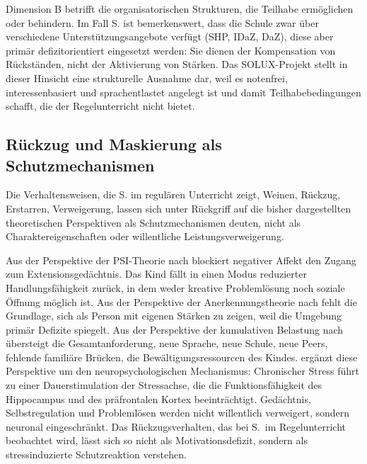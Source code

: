 \documentclass[ngerman, a4paper]{article}
\begin{document}
Dimension B betrifft die organisatorischen Strukturen, die Teilhabe ermöglichen oder
behindern. Im Fall S. ist bemerkenswert, dass die Schule zwar über verschiedene
Unterstützungsangebote verfügt (SHP, IDaZ, DaZ), diese aber primär
defizitorientiert eingesetzt werden: Sie dienen der Kompensation von Rückständen,
nicht der Aktivierung von Stärken. Das SOLUX-Projekt stellt in dieser Hinsicht
eine strukturelle Ausnahme dar, weil es notenfrei, interessenbasiert und
sprachentlastet angelegt ist und damit Teilhabebedingungen schafft, die der
Regelunterricht nicht bietet.

\subsection{Rückzug und Maskierung als Schutzmechanismen}

Die Verhaltensweisen, die S. im regulären Unterricht zeigt, Weinen, Rückzug, Erstarren,
Verweigerung, lassen sich unter Rückgriff auf die bisher dargestellten theoretischen
Perspektiven als Schutzmechanismen deuten, nicht als Charaktereigenschaften oder
willentliche Leistungsverweigerung.

Aus der Perspektive der PSI-Theorie nach \textcite[S.\,35--57]{kuhl2019diversitaet} blockiert negativer Affekt den Zugang zum
Extensionsgedächtnis. Das Kind fällt in einen Modus reduzierter Handlungsfähigkeit
zurück, in dem weder kreative Problemlösung noch soziale Öffnung möglich ist. Aus der
Perspektive der Anerkennungstheorie nach \textcite[S.\,90\psq]{grossrieder2010anerkennung} fehlt die Grundlage, sich als Person
mit eigenen Stärken zu zeigen, weil die Umgebung primär Defizite spiegelt. Aus der
Perspektive der kumulativen Belastung nach \textcite[S.\,86--98]{behrensen2019inklusive} übersteigt die Gesamtanforderung,
neue Sprache, neue Schule, neue Peers, fehlende familiäre Brücken, die
Bewältigungsressourcen des Kindes.
\textcite[S.\,22--23]{evers2025stress} ergänzt diese Perspektive um den
neuropsychologischen Mechanismus: Chronischer Stress führt zu einer
Dauerstimulation der Stressachse, die die Funktionsfähigkeit des
Hippocampus und des präfrontalen Kortex beeinträchtigt. Gedächtnis,
Selbstregulation und Problemlösen werden nicht willentlich verweigert,
sondern neuronal eingeschränkt. Das Rückzugsverhalten, das bei S.\ im
Regelunterricht beobachtet wird, lässt sich so nicht als
Motivationsdefizit, sondern als stressinduzierte Schutzreaktion verstehen.
\end{document}
